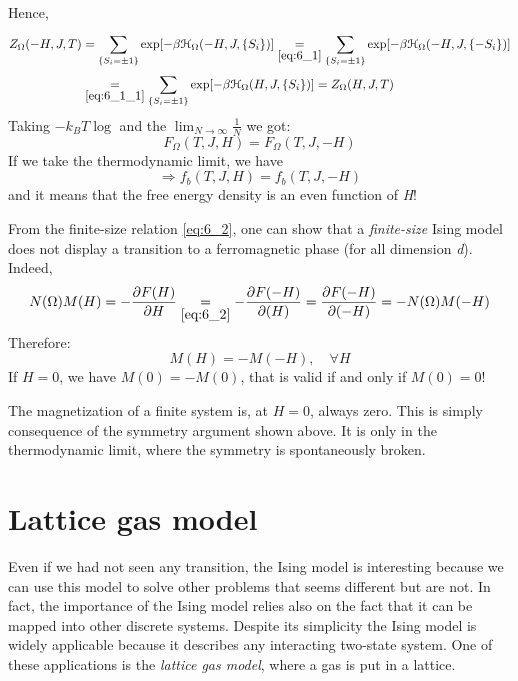 \documentclass[../main/main.tex]{subfiles}
\begin{document}
Hence,
\begin{equation}
  \begin{split}
Z_ \Omega  (-H,J,T) &= \sum_{ \{S_i = \pm 1 \}}^{} \exp [-\beta \mathcal{H}_ \Omega  (-H,J, \{S_i\})]  \underset{\eqref{eq:6_1}}{=}   \sum_{ \{S_i = \pm 1 \}}^{} \exp [-\beta \mathcal{H}_ \Omega  (-H,J,\{-S_i\})] \\
&\underset{\eqref{eq:6_1_1}}{=} \sum_{ \{S_i= \pm 1\}}^{} \exp [-\beta \mathcal{H}_ \Omega  (H,J, \{S_i\}) ] = Z_ \Omega (H,J,T)
\end{split}
\end{equation}
Taking \( -k_B T \log  \)  and the \( \lim_{N \rightarrow \infty } \frac{1}{N} \)  we got:
\begin{equation}
  F_ \Omega  (T,J,H) = F_ \Omega  (T,J,-H)
  \label{eq:6_2}
\end{equation}
If we take the thermodynamic limit, we have
\begin{equation}
\Rightarrow f_b (T,J,H) = f_b (T,J,-H)
\end{equation}
and it means that the free energy density is an even function of \emph{H}!
\begin{remark}
From the finite-size relation \eqref{eq:6_2}, one can show that a \emph{finite-size}  Ising model does not display a transition to a ferromagnetic phase (for all dimension \emph{d}). Indeed,
\begin{equation}
    N (\Omega ) M(H) = - \pdv{F (H)}{H} \underset{\eqref{eq:6_2}}{=}  - \pdv{F(-H)}{(H)} = \pdv{F(-H)}{(-H)}  = - N (\Omega ) M (-H)
\end{equation}
Therefore:
\begin{equation}
  M (H) = - M (-H), \quad \forall H
\end{equation}
If \( H=0 \), we have \( M (0) = -M (0) \), that is valid if and only if \( M(0)= 0 \)!

The magnetization of a finite system is, at \( H=0 \), always zero. This is simply consequence of the symmetry argument shown above. It is only in the thermodynamic limit, where the symmetry is spontaneously broken.
\end{remark}

\section{Lattice gas model}
Even if we had not seen any transition, the Ising model is interesting because we can use this model to solve other problems that seems different but are not. In fact, the importance of the Ising model relies also on the fact that it can be mapped into other discrete systems. Despite its simplicity the Ising model is widely applicable because it describes any interacting two-state system. One of these applications is the \emph{lattice gas model}, where a gas is put in a lattice.
\end{document}

